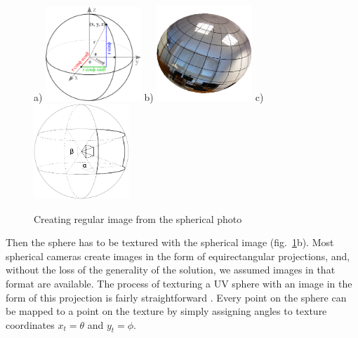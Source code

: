 \documentclass{svproc}
\begin{document}
\begin{figure}[ht!]
    \centering
    a) \hspace{-3mm}\includegraphics[width=0.32\textwidth]{img/genpoint}
    b) \hspace{-3mm}\includegraphics[width=0.32\textwidth]{img/gl_sphere/textured}
    c) \hspace{-3mm}\includegraphics[width=0.32\textwidth]{img/sphere}
    \caption{Creating regular image from the spherical photo}
    \label{fig:spheres}
\end{figure}

Then the sphere has to be textured with the spherical image (fig.~\ref{fig:spheres}b).
Most spherical cameras create images in the form of equirectangular projections, and, without the loss
of the generality of the solution, we assumed images in that format are available.
The process of texturing a UV sphere with an image in the form of this projection is fairly straightforward \cite{greene1986environment}. 
Every point on the sphere can be mapped to a point on the texture by simply assigning angles to texture 
coordinates $x_t = \theta$ and $y_t = \phi$.
\end{document}
